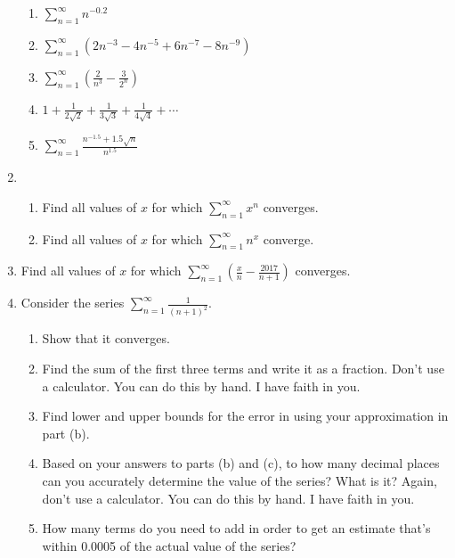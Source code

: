 \documentclass[11pt]{article}
\begin{document}
\begin{enumerate}
\begin{enumerate}
    \item $\displaystyle \sum_{n=1}^\infty n^{-0.2}$

    \item $\displaystyle \sum_{n=1}^\infty
    \left( 2n^{-3} - 4n^{-5} + 6n^{-7} - 8n^{-9} \right)$

    \item $\displaystyle \sum_{n=1}^\infty
    \left( \frac2{n^3} - \frac3{2^n} \right)$

    \item $\displaystyle 
    1 + \frac1{2\sqrt2} + \frac1{3\sqrt3} + \frac1{4\sqrt4} + \cdots$

    \item $\displaystyle \sum_{n=1}^\infty
    \frac{n^{-1.5}+1.5\sqrt n}{n^{1.5}}$

  \end{enumerate}

  \item \begin{enumerate}
    \item Find all values of $x$ for which  $\displaystyle \sum_{n=1}^\infty x^n$
    converges.
    \item Find all values of $x$ for which $\displaystyle \sum_{n=1}^\infty n^x$
    converge.
  \end{enumerate}

  \item Find all values of $x$ for which $\displaystyle \sum_{n=1}^\infty \left(
  \frac xn - \frac{2017}{n+1} \right)$ converges.

  \item Consider the series $\displaystyle \sum_{n=1}^\infty \frac1{(n+1)^2}$.
  \begin{enumerate}
    
    \item Show that it converges.

    \item Find the sum of the first three terms and write it as a fraction.
    Don't use a calculator. You can do this by hand. I have faith in you.

    \item Find lower and upper bounds for the error in using your approximation
    in part (b).
    
    \item Based on your answers to parts (b) and (c), to how many decimal places
    can you accurately determine the value of the series? What is it? Again,
    don't use a calculator. You can do this by hand. I have faith in you.

    \item How many terms do you need to add in order to get an estimate that's
    within 0.0005 of the actual value of the series?

  \end{enumerate}

\end{enumerate}
\end{document}
